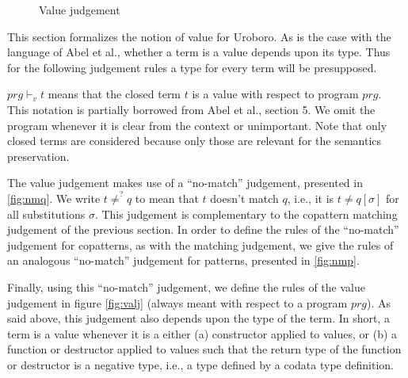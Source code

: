 \begin{figure}
\begin{prooftree}
\end{prooftree}

\begin{prooftree}
\end{prooftree}

\begin{prooftree}
\end{prooftree}
\caption{Value judgement}
\label{fig:valj}
\end{figure}

This section formalizes the notion of value for Uroboro. As is the case with the language of Abel et al.\cite{abel13copatterns}, whether a term is a value depends upon its type. Thus for the following judgement rules a type for every term will be presupposed.

$prg \vdash_v t$ means that the closed term $t$ is a value with respect to program $prg$. This notation is partially borrowed from Abel et al.\cite{abel13copatterns}, section 5. We omit the program whenever it is clear from the context or unimportant. Note that only closed terms are considered because only those are relevant for the semantics preservation.

The value judgement makes use of a ``no-match'' judgement, presented in \autoref{fig:nmq}. We write $t \neq^? q$ to mean that $t$ doesn't match $q$, i.e., it is $t \neq q[\sigma]$ for all substitutions $\sigma$. This judgement is complementary to the copattern matching judgement of the previous section. In order to define the rules of the ``no-match'' judgement for copatterns, as with the matching judgement, we give the rules of an analogous ``no-match'' judgement for patterns, presented in \autoref{fig:nmp}.

Finally, using this ``no-match'' judgement, we define the rules of the value judgement in figure \autoref{fig:valj} (always meant with respect to a program $prg$). As said above, this judgement also depends upon the type of the term. In short, a term is a value whenever it is a either (a) constructor applied to values, or (b) a function or destructor applied to values such that the return type of the function or destructor is a negative type, i.e., a type defined by a codata type definition.

